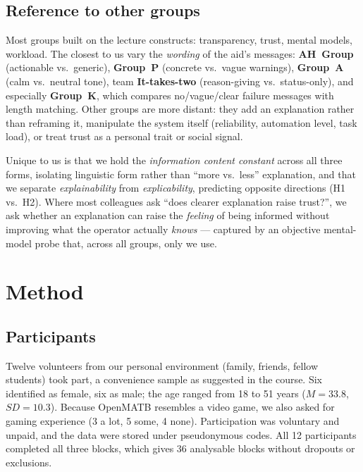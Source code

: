\documentclass[10pt,twocolumn]{article}
\begin{document}
\subsection{Reference to other groups}
Most groups built on the lecture constructs: transparency, trust, mental models, workload. The closest to us vary the \textit{wording} of the aid's messages: \textbf{AH~Group} (actionable vs.\ generic), \textbf{Group~P} (concrete vs.\ vague warnings), \textbf{Group~A} (calm vs.\ neutral tone), team \textbf{It-takes-two} (reason-giving vs.\ status-only), and especially \textbf{Group~K}, which compares no/vague/clear failure messages with length matching. Other groups are more distant: they add an explanation rather than reframing it, manipulate the system itself (reliability, automation level, task load), or treat trust as a personal trait or social signal.

Unique to us is that we hold the \textit{information content constant} across all three forms, isolating linguistic form rather than ``more vs.\ less'' explanation, and that we separate \textit{explainability} from \textit{explicability}, predicting opposite directions (H1 vs.\ H2). Where most colleagues ask ``does clearer explanation raise trust?'', we ask whether an explanation can raise the \textit{feeling} of being informed without improving what the operator actually \textit{knows} --- captured by an objective mental-model probe that, across all groups, only we use.

\section{Method}

\subsection{Participants}
Twelve volunteers from our personal environment (family, friends, fellow students) took part, a convenience sample as suggested in the course. Six identified as female, six as male; the age ranged from 18 to 51 years ($M = 33.8$, $SD = 10.3$). Because OpenMATB resembles a video game, we also asked for gaming experience (3 a lot, 5 some, 4 none). Participation was voluntary and unpaid, and the data were stored under pseudonymous codes. All 12 participants completed all three blocks, which gives 36 analysable blocks without dropouts or exclusions.
\end{document}
